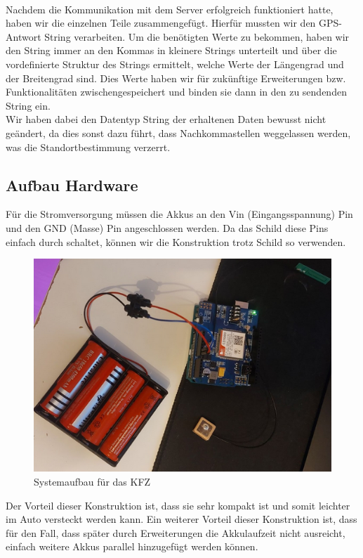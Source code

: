 \\
Nachdem die Kommunikation mit dem Server erfolgreich funktioniert hatte, haben wir die einzelnen Teile zusammengefügt. Hierfür mussten wir den GPS-Antwort String verarbeiten. Um die benötigten Werte zu bekommen, haben wir den String immer an den Kommas in kleinere Strings unterteilt und über die vordefinierte Struktur des Strings ermittelt, welche Werte der Längengrad und der Breitengrad sind. Dies Werte haben wir für zukünftige Erweiterungen bzw. Funktionalitäten zwischengespeichert und binden sie dann in den zu sendenden String ein.
\\
Wir haben dabei den Datentyp String der erhaltenen Daten bewusst nicht geändert, da dies sonst dazu führt, dass Nachkommastellen weggelassen werden, was die Standortbestimmung verzerrt.

\subsection{Aufbau Hardware}
Für die Stromversorgung müssen die Akkus an den Vin (Eingangsspannung) Pin und den GND (Masse) Pin angeschlossen werden. Da das Schild diese Pins einfach durch schaltet, können wir die Konstruktion trotz Schild so verwenden.
\begin{figure} [H]
	\begin{center}
		\includegraphics[width=1\textwidth]{Bilder/Arduino_Aufbau.png}
		\caption{Systemaufbau für das KFZ}
		\label{hw-system}
	\end{center}
\end{figure}
Der Vorteil dieser Konstruktion ist, dass sie sehr kompakt ist und somit leichter im Auto versteckt werden kann. Ein weiterer Vorteil dieser Konstruktion ist, dass für den Fall, dass später durch Erweiterungen die Akkulaufzeit nicht ausreicht, einfach weitere Akkus parallel hinzugefügt werden können.

